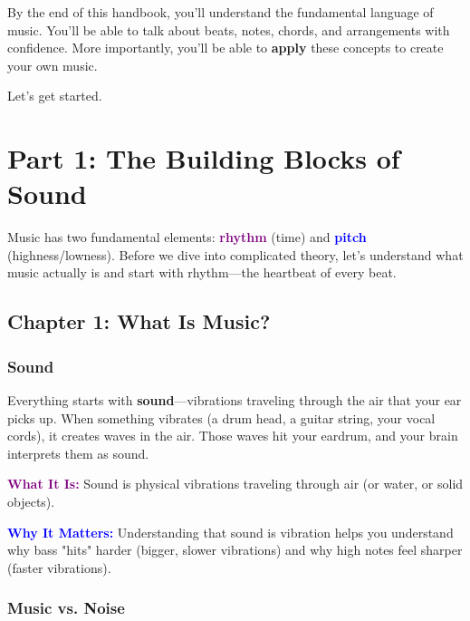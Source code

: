 \documentclass[11pt,letterpaper]{article}
\newcommand{\purple}[1]{\textcolor{purple}{\textbf{#1}}}
\newcommand{\bluepurple}[1]{\textcolor{blue}{\textbf{#1}}}
\begin{document}
By the end of this handbook, you'll understand the fundamental language of music. You'll be able to talk about beats, notes, chords, and arrangements with confidence. More importantly, you'll be able to \textbf{apply} these concepts to create your own music.

Let's get started.

\newpage


\section{Part 1: The Building Blocks of Sound}

Music has two fundamental elements: \purple{rhythm} (time) and \bluepurple{pitch} (highness/lowness). Before we dive into complicated theory, let's understand what music actually is and start with rhythm—the heartbeat of every beat.


\subsection{Chapter 1: What Is Music?}

\subsubsection{Sound}

Everything starts with \textbf{sound}—vibrations traveling through the air that your ear picks up. When something vibrates (a drum head, a guitar string, your vocal cords), it creates waves in the air. Those waves hit your eardrum, and your brain interprets them as sound.

\textbf{\purple{What It Is:}} Sound is physical vibrations traveling through air (or water, or solid objects).

\textbf{\bluepurple{Why It Matters:}} Understanding that sound is vibration helps you understand why bass "hits" harder (bigger, slower vibrations) and why high notes feel sharper (faster vibrations).

\subsubsection{Music vs. Noise}
\end{document}

